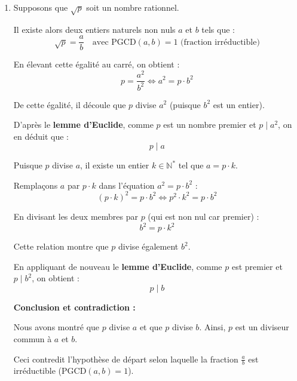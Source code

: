 \begin{enumerate}[label=\thechapter.\arabic*, font=\bfseries, itemsep=7mm,labelsep*=3mm,left=0mm]
\begin{enumerate}[label=\textbf{\arabic*)}, leftmargin=*]
	Testons la divisibilité par les premiers nombres premiers :
	\begin{itemize}
		\item $66\,661$ n'est pas pair, ne se termine pas par $0$ ou $5$, et la somme de ses chiffres ($6+6+6+6+1 = 25$) n'est pas divisible par $3$.
		\item $66\,661 = 7 \cdot 9523 + 0$.
	\end{itemize}
	On constate que $66\,661 = 7 \cdot 9523$. \\
	\textbf{Conclusion :} $66\,661$ admet d'autres diviseurs que $1$ et lui-même. Le nombre \textbf{$66\,661$ n'est pas premier} (il est composé).
\end{enumerate}



\item Supposons que $\sqrt{p}$ soit un nombre rationnel.

Il existe alors deux entiers naturels non nuls $a$ et $b$ tels que :
\[
\sqrt{p} = \frac{a}{b} \quad \text{avec } \text{PGCD}(a, b) = 1 \text{ (fraction irréductible)}
\]

En élevant cette égalité au carré, on obtient :
\[
p = \frac{a^2}{b^2} \iff a^2 = p \cdot b^2
\]

De cette égalité, il découle que $p$ divise $a^2$ (puisque $b^2$ est un entier).

D'après le \textbf{lemme d'Euclide}, comme $p$ est un nombre premier et $p \mid a^2$, on en déduit que :
\[
p \mid a
\]

Puisque $p$ divise $a$, il existe un entier $k \in \mathbb{N}^*$ tel que $a = p \cdot k$.

Remplaçons $a$ par $p \cdot k$ dans l'équation $a^2 = p \cdot b^2$ :
\[
(p \cdot k)^2 = p \cdot b^2 \iff p^2 \cdot k^2 = p \cdot b^2
\]

En divisant les deux membres par $p$ (qui est non nul car premier) :
\[
b^2 = p \cdot k^2
\]

Cette relation montre que $p$ divise également $b^2$.

En appliquant de nouveau le \textbf{lemme d'Euclide}, comme $p$ est premier et $p \mid b^2$, on obtient :
\[
p \mid b
\]

\textbf{Conclusion et contradiction :}

Nous avons montré que $p$ divise $a$ et que $p$ divise $b$. Ainsi, $p$ est un diviseur commun à $a$ et $b$.

Ceci contredit l'hypothèse de départ selon laquelle la fraction $\frac{a}{b}$ est irréductible ($\text{PGCD}(a,b) = 1$).


\end{enumerate}
